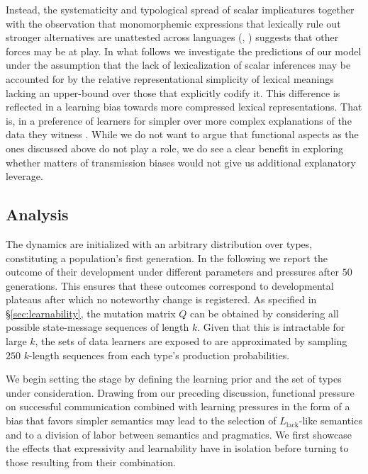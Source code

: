 \documentclass[a4paper, 11pt]{article}
\newcommand{\mylang}[1]{\ensuremath{L_{\text{#1}}}\xspace} %
\newcommand{\Llack}{\mylang{lack}}
\begin{document}
Instead, the systematicity and typological spread of scalar implicatures together with the observation that monomorphemic expressions that lexically rule out stronger alternatives are unattested across languages (\citealt[252-267]{horn:1984}, \citealt{horn:1972,traugott:2004,vdAuwera:2010}) suggests that other forces may be at play. In what follows we investigate the predictions of our model under the assumption that the lack of lexicalization of scalar inferences may be accounted for by the relative representational simplicity of lexical meanings lacking an upper-bound over those that explicitly codify it. This difference is reflected in a learning bias towards more compressed lexical representations. That is, in a preference of learners for simpler over more complex explanations of the data they witness \citep{feldman:2000, chater+vitanyi:2003, piantadosi+etal:2012a, kirby+etal:2015,piantadosi+etal:underreview}. While we do not want to argue that functional aspects as the ones discussed above do not play a role, we do see a clear benefit in exploring whether matters of transmission biases would not give us additional explanatory leverage.


\subsection{Analysis}
The dynamics are initialized with an arbitrary distribution over types, constituting a population's first generation. In the following we report the outcome of their development under different parameters and pressures after $50$ generations. This ensures that these outcomes correspond to developmental plateaus after which no noteworthy change is registered. As specified in \S\ref{sec:learnability}, the mutation matrix $Q$ can be obtained by considering all possible state-message sequences of length $k$. Given that this is intractable for large $k$, the sets of data learners are exposed to are approximated by sampling $250$ $k$-length sequences from each type's production probabilities. 

We begin setting the stage by defining the learning prior and the set of types under consideration. Drawing from our preceding discussion, functional pressure on successful communication combined with learning pressures in the form of a bias that favors simpler semantics may lead to the selection of $\Llack$-like semantics and to a division of labor between semantics and pragmatics. We first showcase the effects that expressivity and learnability have in isolation before turning to those resulting from their combination. 
\end{document}
